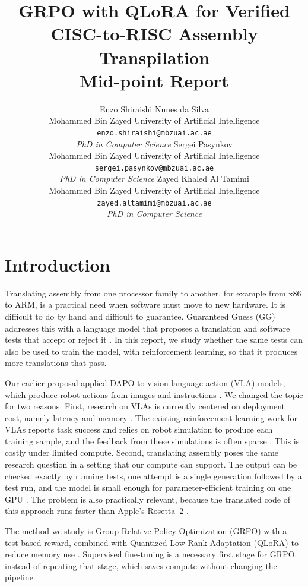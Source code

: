 \documentclass{article}
\title{GRPO with QLoRA for Verified CISC-to-RISC Assembly Transpilation\\\large Mid-point Report}
\author{%
  Enzo Shiraishi Nunes da Silva \\
  Mohammed Bin Zayed University of Artificial Intelligence \\
  \texttt{enzo.shiraishi@mbzuai.ac.ae} \\
  \textit{PhD in Computer Science}
  \And
  Sergei Pasynkov \\
  Mohammed Bin Zayed University of Artificial Intelligence \\
  \texttt{sergei.pasynkov@mbzuai.ac.ae} \\
  \textit{PhD in Computer Science}
  \And
  Zayed Khaled Al Tamimi \\
  Mohammed Bin Zayed University of Artificial Intelligence \\
  \texttt{zayed.altamimi@mbzuai.ac.ae} \\
  \textit{PhD in Computer Science}
}
\newif\iftracked
\newcommand{\added}[1]{\iftracked\hl{#1}\else#1\fi}
\newcommand{\deleted}[1]{\iftracked\textcolor{red}{\st{#1}}\ \fi}
\begin{document}
\maketitle

\section{Introduction}

Translating assembly from one processor family to another, for example from x86 to ARM, is a practical need when software must move to new hardware. It is difficult to do by hand and difficult to guarantee. Guaranteed Guess (GG) addresses this with a language model that proposes a translation and software tests that accept or reject it \citep{gg}. In this report, we study whether the same tests can also be used to train the model, with reinforcement learning, so that it produces more translations that pass.

Our earlier proposal applied DAPO to vision-language-action (VLA) models, which produce robot actions from images and instructions \citep{dapo}. We changed the topic for two reasons. First, research on VLAs is currently centered on deployment cost, namely latency and memory \citep{guan2025efficientvla,yu2025survey}. The existing reinforcement learning work for VLAs reports task success and relies on robot simulation to produce each training sample, and the feedback from these simulations is often sparse \citep{simplevlarl,vlarl,rlinfvla}. This is costly under limited compute. Second, translating assembly poses the same research question in a setting that our compute can support. The output can be checked exactly by running tests, one attempt is a single generation followed by a test run, and the model is small enough for parameter-efficient training on one GPU \citep{gg}. The problem is also practically relevant, because the translated code of this approach runs faster than Apple's Rosetta~2 \citep{gg}.

The method we study is Group Relative Policy Optimization (GRPO) with a test-based reward, combined with Quantized Low-Rank Adaptation (QLoRA) to reduce memory use \citep{deepseekmath,qlora}. Supervised fine-tuning is a necessary first stage for GRPO. \deleted{Because we use the same data as GG, we start from its released checkpoint} instead of repeating that stage, which saves compute without changing the pipeline.
\end{document}
